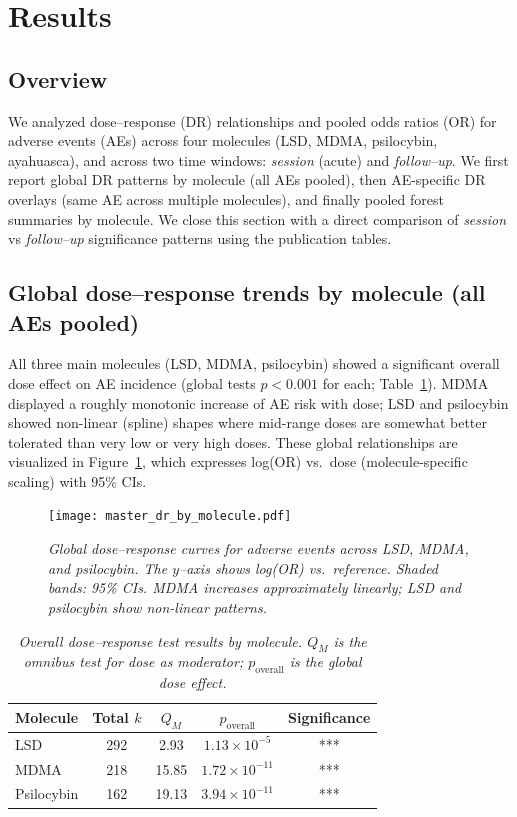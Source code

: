 \documentclass[12pt,a4paper]{article}
\begin{document}
\section{Results}

\subsection{Overview}
We analyzed dose--response (DR) relationships and pooled odds ratios (OR) for adverse events (AEs) across four molecules (LSD, MDMA, psilocybin, ayahuasca), and across two time windows: \emph{session} (acute) and \emph{follow--up}. We first report global DR patterns by molecule (all AEs pooled), then AE-specific DR overlays (same AE across multiple molecules), and finally pooled forest summaries by molecule. We close this section with a direct comparison of \emph{session} vs \emph{follow--up} significance patterns using the publication tables.

\subsection{Global dose--response trends by molecule (all AEs pooled)}
All three main molecules (LSD, MDMA, psilocybin) showed a significant overall dose effect on AE incidence (global tests $p<0.001$ for each; Table~\ref{tab:global}). MDMA displayed a roughly monotonic increase of AE risk with dose; LSD and psilocybin showed non-linear (spline) shapes where mid-range doses are somewhat better tolerated than very low or very high doses. These global relationships are visualized in Figure~\ref{fig:dr_global}, which expresses log(OR) vs.\ dose (molecule-specific scaling) with 95\% CIs.

\begin{figure}[htb]
  \centering
  \texttt{[image: master\_dr\_by\_molecule.pdf]}
  \caption{\textit{Global dose--response curves for adverse events across LSD, MDMA, and psilocybin. The $y$--axis shows log(OR) vs.\ reference. Shaded bands: 95\% CIs. MDMA increases approximately linearly; LSD and psilocybin show non-linear patterns.}}
  \label{fig:dr_global}
\end{figure}

\begin{table}[htb]
\centering
\caption{\textit{Overall dose--response test results by molecule. $Q_M$ is the omnibus test for dose as moderator; $p_{\text{overall}}$ is the global dose effect.}}
\label{tab:global}
\begin{tabular}{lcccc}
\toprule
Molecule & Total $k$ & $Q_M$ & $p_{\text{overall}}$ & Significance \\
\midrule
LSD        & 292 & 2.93  & $1.13\times 10^{-5}$  & *** \\
MDMA       & 218 & 15.85 & $1.72\times 10^{-11}$ & *** \\
Psilocybin & 162 & 19.13 & $3.94\times 10^{-11}$ & *** \\
\bottomrule
\end{tabular}
\end{table}
\end{document}
